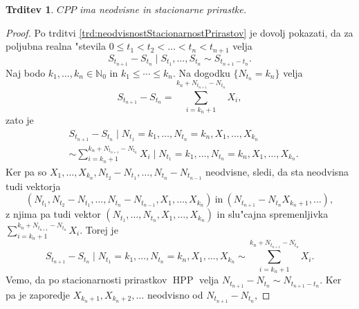 \documentclass[12pt, a4paper, reqno]{amsart}
\theoremstyle{definition}
\theoremstyle{plain}
\newtheorem{trditev}[definicija]{Trditev}
\newcommand{\N}{\mathbb{N}}
\newcommand{\1}{\mathds{1}}
\DeclareMathOperator{\HPP}{HPP}
\begin{document}
        \begin{trditev}
            $CPP$ ima neodvisne in stacionarne prirastke.
            \label{trd:neodvPrirCPP}
        \end{trditev}

        \begin{proof}
            Po trditvi \ref{trd:neodvisnostStacionarnostPrirastov} je dovolj pokazati, da za poljubna 
            realna "stevila
            $0\leq t_1 < t_2 < \ldots< t_n < t_{n+1}$ velja 
            \begin{equation*}
                S_{t_{n+1}} - S_{t_n}\mid S_{t_1}, \dots, S_{t_n} \sim S_{t_{n+1} - t_n}.
            \end{equation*}
            Naj bodo $k_1, \dots, k_n \in \N_0$ in $k_1\leq \cdots \leq k_n$. Na dogodku 
            $\{N_{t_n} = k_n\}$ velja 
            \begin{equation*}
                S_{t_{n+1}} - S_{t_n} = \sum_{i = k_n + 1}^{k_n + N_{t_{n+1}} - N_{t_n}}X_i,
            \end{equation*}
            zato je 
            \begin{align*}
                &S_{t_{n+1}} - S_{t_n}\mid N_{t_1}= k_1, \dots, N_{t_n} = k_n, X_1, \dots, X_{k_n} \\
                &\sim \sum_{i = k_n + 1}^{k_n + N_{t_{n+1}} - N_{t_n}}X_i\mid N_{t_1}= k_1, \dots, N_{t_n} = k_n, X_1, \dots, X_{k_n}.
            \end{align*}
            Ker pa so $X_1, \dots, X_{k_n}, N_{t_2} - N_{t_1}, \dots, N_{t_n} - N_{t_{n-1}}$ neodvisne, sledi, 
            da sta neodvisna tudi vektorja 
            $$(N_{t_1}, N_{t_2} - N_{t_1}, \dots, N_{t_n} - N_{t_{n-1}}, X_1, \dots, X_{k_n}) \ \text{in} \
            (N_{t_{n+1}} - N_{t_n} X_{k_n + 1}, \dots),$$ z njima pa tudi vektor
            $(N_{t_1}, \dots, N_{t_n}, X_1, \dots, X_{k_n})$ in slu"cajna spremenljivka \newline
            $\sum_{i = k_n + 1}^{k_n + N_{t_{n+1}} - N_{t_n}}X_i$. Torej je
            \begin{equation*}
                S_{t_{n+1}} - S_{t_n}\mid N_{t_1} = k_1, \dots, N_{t_n} = k_n, X_1, \dots, X_{k_n} \sim
                \sum_{i = k_n + 1}^{k_n + N_{t_{n+1}} - N_{t_n}}X_i.
            \end{equation*}
            Vemo, da po stacionarnosti prirastkov $\HPP$ velja $N_{t_{n+1}} - N_{t_n} \sim N_{t_{n+1} - t_n}$. 
            Ker pa je zaporedje $X_{k_n + 1}, X_{k_n + 2}, \dots$ neodvisno od $N_{t_{n+1}} - N_{t_n}$,

\end{proof}
\end{document}
